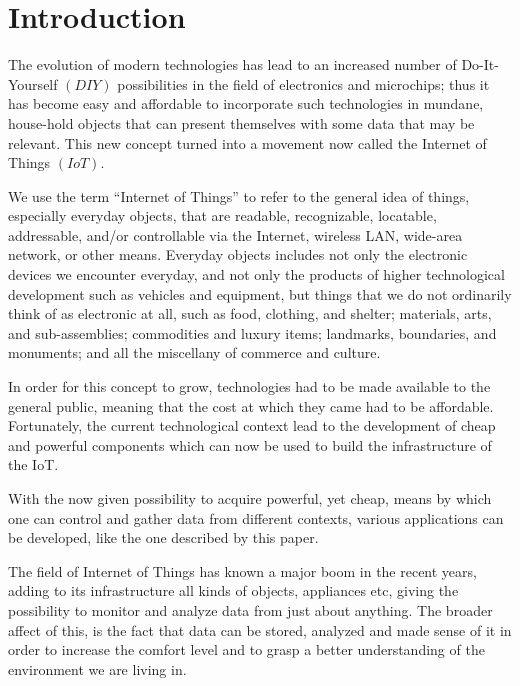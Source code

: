 \chapter*{Introduction}

\qquad The evolution of modern technologies has lead to an increased number of Do-It-Yourself $(DIY)$ possibilities in
the field of electronics and microchips; thus it has become easy and affordable to incorporate such
technologies in mundane, house-hold objects that can present themselves with some data that may be relevant.
This new concept turned into a movement now called the Internet of Things $(IoT)$.

\qquad We use the term “Internet of Things” to refer to the general idea of things, especially everyday objects, that
are readable, recognizable, locatable, addressable, and/or controllable via the Internet,
wireless LAN, wide-area network, or other means. Everyday objects includes not only the electronic devices we
encounter everyday, and not only the products of higher technological development such as vehicles and
equipment, but things that we do not ordinarily think of as electronic at all, such as food, clothing, and
shelter; materials, arts, and sub-assemblies; commodities and luxury items; landmarks, boundaries,
and monuments; and all the miscellany of commerce and culture. \cite{DisruptiveCivilTechnologies}

In order for this concept to grow, technologies had to be made available to the general public, meaning that
the cost at which they came had to be affordable. Fortunately, the current technological context lead to
the development of cheap and powerful components which can now be used to build the infrastructure of the IoT.

With the now given possibility to acquire powerful, yet cheap, means by which one can control and gather data
from different contexts, various applications can be developed, like the one described by this paper.

\qquad The field of Internet of Things has known a major boom in the recent years, adding to its infrastructure
all kinds of objects, appliances etc, giving the possibility to monitor and analyze data from just about
anything. The broader affect of this, is the fact that data can be stored, analyzed and made sense of it
in order to increase the comfort level and to grasp a better understanding of the environment we are living in.

